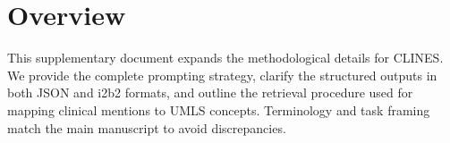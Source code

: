 \section{Overview}

This supplementary document expands the methodological details for CLINES. We provide the complete prompting strategy, clarify the structured outputs in both JSON and i2b2 formats, and outline the retrieval procedure used for mapping clinical mentions to UMLS concepts. Terminology and task framing match the main manuscript to avoid discrepancies.
